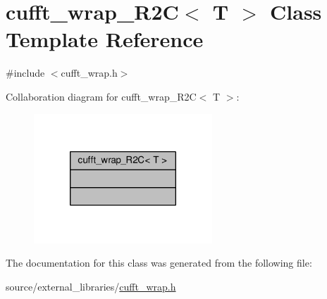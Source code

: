 \hypertarget{classcufft__wrap__R2C}{\section{cufft\-\_\-wrap\-\_\-\-R2\-C$<$ T $>$ Class Template Reference}
\label{classcufft__wrap__R2C}
}


{\ttfamily \#include $<$cufft\-\_\-wrap.\-h$>$}



Collaboration diagram for cufft\-\_\-wrap\-\_\-\-R2\-C$<$ T $>$\-:
\nopagebreak
\begin{figure}[H]
\begin{center}
\leavevmode
\includegraphics[width=190pt]{classcufft__wrap__R2C__coll__graph}
\end{center}
\end{figure}


The documentation for this class was generated from the following file\-:\begin{DoxyCompactItemize}
\item 
source/external\-\_\-libraries/\hyperlink{cufft__wrap_8h}{cufft\-\_\-wrap.\-h}\end{DoxyCompactItemize}

